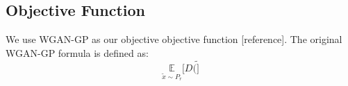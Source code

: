 \subsection{Objective Function}
We use WGAN-GP as our objective objective function [reference]. The original WGAN-GP formula is defined as:
\begin{equation}
\underset{\widetilde{x} \sim P_r}{\mathbb{E}}[D(\widetilde]
\end{equation}